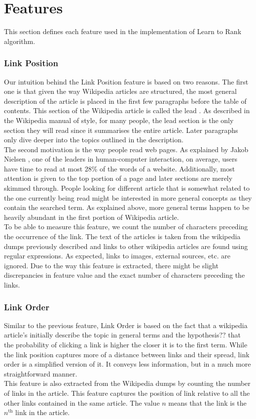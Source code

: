 \section{Features}
This section defines each feature used in the implementation of Learn to Rank algorithm.

\subsubsection{Link Position}
Our intuition behind the Link Position feature is based on two reasons. The first one is that given the way Wikipedia articles are structured, the most general description of the article is placed in the first few paragraphs before the table of contents. This section of the Wikipedia article is called the lead \cite{lead}. As described in the Wikipedia manual of style, for many people, the lead section is the only section they will read since it summarises the entire article. Later paragraphs only dive deeper into the topics outlined in the description. \\
The second motivation is the way people read web pages. As explained by Jakob Nielsen  \cite{nielsen}, one of the leaders in human-computer interaction, on average, users have time to read at most 28\% of the words of a website. Additionally, most attention is given to the top portion of a page and later sections are merely skimmed through. People looking for different article that is somewhat related to the one currently being read might be interested in more general concepts as they contain the searched term. As explained above, more general terms happen to be heavily abundant in the first portion of Wikipedia article. \\
To be able to measure this feature, we count the number of characters preceding the occurrence of the link. The text of the articles is taken from the wikipedia dumps previously described and links to other wikipedia articles are found using regular expressions. As expected, links to images, external sources, etc. are ignored. Due to the way this feature is extracted, there might be slight discrepancies in feature value and the exact number of characters preceding the links. \\

\subsubsection{Link Order}
Similar to the previous feature, Link Order is based on the fact that a wikipedia article's initially describe the topic in general terms and the hypothesis?? that the probability of clicking a link is higher the closer it is to the first term. While the link position captures more of a distance between links and their spread, link order is a simplified version of it. It conveys less information, but in a much more straightforward manner. \\
This feature is also extracted from the Wikipedia dumps by counting the number of links in the article. This feature captures the position of link relative to all the other links contained in the same article. The value $n$ means that the link is the $n^{\text{th}}$ link in the article. \\

